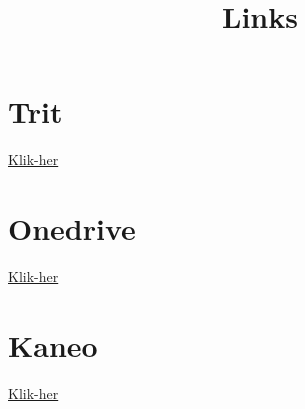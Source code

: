 \documentclass[a4paper,12pt]{article}
\title{Links}
\begin{document}
\maketitle

\section{Trit}
\href{https://overleaf.trit.au.dk/project/6a8d80d3c9d204625f487245/invite/token/bfc57faf7ae9e8385e67b60f1d07060246cf21a1fdecaf56}{Klik-her}


\section{Onedrive}
\href{https://aarhusuniversitet-my.sharepoint.com/:f:/g/personal/au780068_uni_au_dk/IgDwXT80DgrERoDELxkZ9EvhAXCKid-1hXYYbnTBg_3ttGE?e=wkl1Gr}{Klik-her}


\section{Kaneo}
\href{https://kaneo.mosekjaer.com/invitation/accept/VI7UlD9HuN3NTND8vqDTVehmeKg9qnqE?email=au780068@uni.au.dk}{Klik-her}
\end{document}
